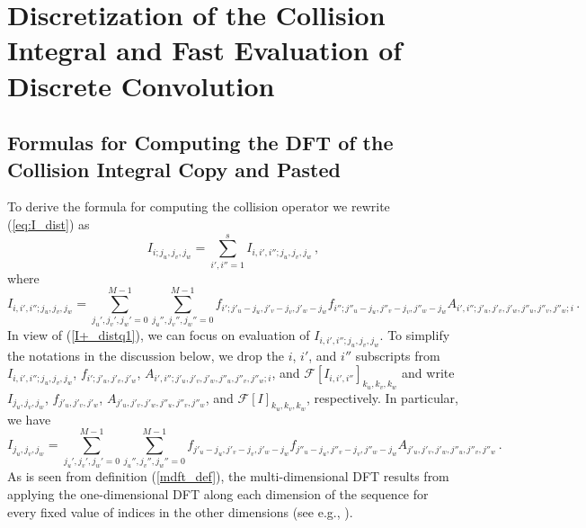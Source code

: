 \documentclass[12pt]{CSUNthesis}
\def\calF{\mathcal{F}}
\begin{document}
\chapter{Discretization of the Collision Integral and Fast Evaluation of Discrete Convolution}
\label{chap:fast_eval}

\section{Formulas for Computing the DFT of the Collision Integral Copy and Pasted}
To derive the formula for computing the collision operator we rewrite (\ref{eq:I_dist}) as
\begin{equation}
\label{I+_distq1}
I_{i;j_{u},j_{v},j_{w}}= \sum_{i',i''=1}^s I_{i,i',i'';j_{u},j_{v},j_{w}} \, ,
\end{equation}
where 
\begin{equation*}
I_{i,i',i'';j_{u},j_{v},j_{w}}=  \sum_{j_u',j_v',j_w'=0}^{M-1} \sum_{j_u'',j_v'',j_w''=0}^{M-1} f_{i';j'_{u}-j_{u},j'_{v}-j_{v},j'_{w}-j_{w}} f_{i'';j''_{u}-j_{u},j''_{v}-j_{v},j''_{w}-j_{w}} A_{i',i'';j'_{u},j'_{v},j'_{w},j''_u,j''_{v},j''_{w};i}\, .
\end{equation*}
In view of (\ref{I+_distq1}), we can focus on evaluation of $I_{i,i',i'';j_{u},j_{v},j_{w}}$. 
To simplify the notations in the discussion below, we drop the $i$, $i'$, and $i''$ subscripts from 
$I_{i,i',i'';j_{u},j_{v},j_{w}}$, $f_{i';j'_{u},j'_{v},j'_{w}}$, 
$A_{i',i'';j'_{u},j'_{v},j'_{w},j''_u,j''_{v},j''_{w};i}$, and  $\calF[I_{i,i',i''}]_{k_{u},k_{v},k_{w}}$ 
and write $I_{j_u,j_v,j_w}$, $f_{j'_{u},j'_{v},j'_{w}}$, 
$A_{j'_{u},j'_{v},j'_{w},j''_u,j''_{v},j''_{w}}$, and $\calF[I]_{k_{u},k_{v},k_{w}}$, respectively. 
In particular, we have
\begin{equation}
\label{I_all_index}
I_{j_u,j_v,j_w}=  \sum_{j_u',j_v',j_w'=0}^{M-1} \sum_{j_u'',j_v'',j_w''=0}^{M-1}f_{j'_{u}-j_{u},j'_{v}-j_{v},j'_{w}-j_{w}} f_{j''_{u}-j_{u},j''_{v}-j_{v},j''_{w}-j_{w}} A_{j'_{u},j'_{v},j'_{w},j''_u,j''_{v},j''_{w}}\, .
\end{equation}
As is seen from definition (\ref{mdft_def}), the multi-dimensional DFT results from applying the one-dimensional DFT along each dimension of the sequence for every fixed value of indices in the other dimensions (see e.g., \cite{Nussbaumer1982}).
\end{document}
